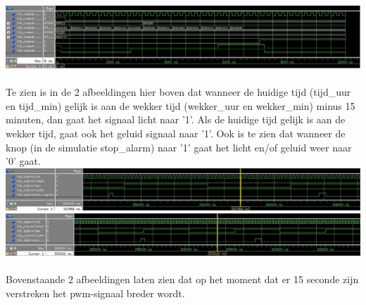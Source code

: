\includegraphics[width=\textwidth,height=\textheight,keepaspectratio]{Figuren/Alarm/Compare_ext.jpg}
\\
\\
Te zien is in de 2 afbeeldingen hier boven dat wanneer de huidige tijd (tijd\_uur en tijd\_min) gelijk is aan de wekker tijd (wekker\_uur en wekker\_min) minus 15 minuten, dan gaat het signaal licht naar '1'. Als de huidige tijd gelijk is aan de wekker tijd, gaat ook het geluid signaal naar '1'.
Ook is te zien dat wanneer de knop (in de simulatie stop\_alarm) naar '1' gaat het licht en/of geluid weer naar '0' gaat.
\\

\includegraphics[width=\textwidth,height=\textheight,keepaspectratio]{Figuren/Alarm/Alarm_beh.jpg}
\\

\includegraphics[width=\textwidth,height=\textheight,keepaspectratio]{Figuren/Alarm/Alarm_ext.jpg}
\\
\\
Bovenstaande 2 afbeeldingen laten zien dat op het moment dat er 15 seconde zijn verstreken het pwm-signaal breder wordt.
